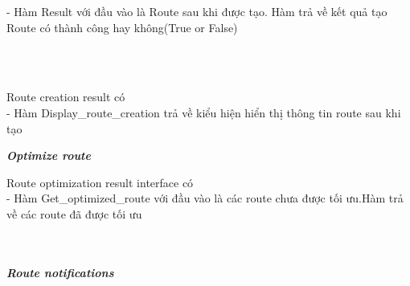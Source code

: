 \documentclass[a4paper]{article}
\begin{document}
\begin{itemize}
\begin{minipage}[b]{0.4\textwidth}
- Hàm Result với đầu vào là Route sau khi được tạo. Hàm trả về kết quả tạo Route có thành công hay không(True or False)
\end{minipage}
\hfill
{}
\\ \\
\begin{minipage}[b]{0.4\textwidth}
  Route creation result có \\
- Hàm Display\_route\_creation trả về kiểu hiện hiển thị thông tin route sau khi tạo
\end{minipage}
\hfill
{}
\newline
\newline
\textbf{    \textit{Optimize route} } \\
\begin{minipage}[b]{0.4\textwidth}
 Route optimization result interface có \\
- Hàm Get\_optimized\_route với đầu vào là các route chưa được tối ưu.Hàm trả về các route đã được tối ưu\\
\end{minipage}
\hfill
{}
\\ \\
\newline
\newline
\newpage
\textbf{    \textit{Route notifications } } \\
\begin{minipage}[b]{0.4\textwidth}

\end{minipage}
\end{itemize}
\end{document}
